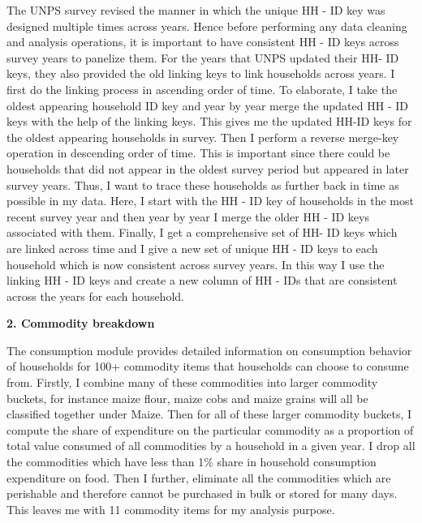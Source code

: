 \documentclass[12pt]{article}
\begin{document}
{{The UNPS survey revised the manner in which the unique HH - ID key was designed multiple times across years. Hence before performing any data cleaning and analysis operations, it is important to have consistent HH - ID keys across survey years to panelize them. For the years that UNPS updated their HH- ID keys, they also provided the old linking keys to link households across years. I first do the linking process in ascending order of time. To elaborate, I take the oldest appearing household ID key and year by year merge the updated HH - ID keys with the help of the linking keys. This gives me the updated HH-ID keys for the oldest appearing households in survey. Then I perform a reverse merge-key operation in descending order of time. This is important since there could be households that did not appear in the oldest survey period but appeared in later survey years. Thus, I want to trace these households as further back in time as possible in my data. Here, I start with the HH - ID key of households in the most recent survey year and then year by year I merge the older HH - ID keys associated with them. Finally, I get a comprehensive set of HH- ID keys which are linked across time and I give a new set of unique HH - ID keys to each household which is now consistent across survey years. In this way I use the linking HH - ID keys and create a new column of HH - IDs that are consistent across the years for each household. 

\clearpage


\textbf{ 2. Commodity breakdown}

\hspace{1cm} The consumption module provides detailed information on consumption behavior of households for 100+ commodity items that households can choose to consume from. Firstly, I combine many of these commodities into larger commodity buckets, for instance maize flour, maize cobs and maize grains will all be classified together under Maize. Then for all of these larger commodity buckets, I compute the share of expenditure on the particular commodity as a proportion of total value consumed of all commodities by a household in a given year. I drop all the commodities which have less than 1\% share in household consumption expenditure on food. Then I further, eliminate all the commodities which are perishable and therefore cannot be purchased in bulk or stored for many days. This leaves me with 11 commodity items for my analysis purpose.

\vspace{1cm}

}}
\end{document}
